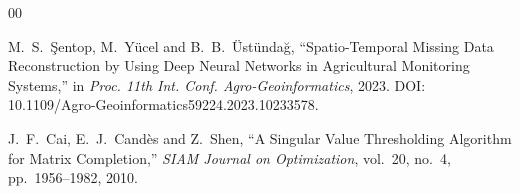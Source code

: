 \documentclass[conference]{IEEEtran}
\begin{document}
\begin{thebibliography}{00}

M.~S.~\c{S}entop, M.~Y\"{u}cel and B.~B.~\"{U}st\"{u}nda\u{g}, ``Spatio-Temporal Missing Data Reconstruction by Using Deep Neural Networks in Agricultural Monitoring Systems,'' in \textit{Proc. 11th Int. Conf. Agro-Geoinformatics}, 2023. DOI: 10.1109/Agro-Geoinformatics59224.2023.10233578.

J.~F.~Cai, E.~J.~Cand\`{e}s and Z.~Shen, ``A Singular Value Thresholding Algorithm for Matrix Completion,'' \textit{SIAM Journal on Optimization}, vol.~20, no.~4, pp.~1956--1982, 2010.

\end{thebibliography}
\end{document}
